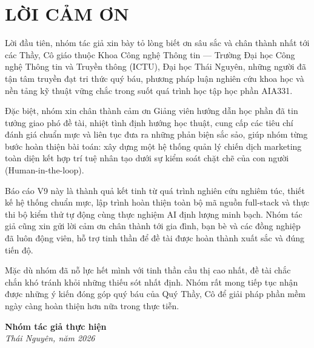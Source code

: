 \chapter*{LỜI CẢM ƠN}

Lời đầu tiên, nhóm tác giả xin bày tỏ lòng biết ơn sâu sắc và chân thành nhất tới các Thầy, Cô giáo thuộc Khoa Công nghệ Thông tin --- Trường Đại học Công nghệ Thông tin và Truyền thông (ICTU), Đại học Thái Nguyên, những người đã tận tâm truyền đạt tri thức quý báu, phương pháp luận nghiên cứu khoa học và nền tảng kỹ thuật vững chắc trong suốt quá trình học tập học phần AIA331.

Đặc biệt, nhóm xin chân thành cảm ơn Giảng viên hướng dẫn học phần đã tin tưởng giao phó đề tài, nhiệt tình định hướng học thuật, cung cấp các tiêu chí đánh giá chuẩn mực và liên tục đưa ra những phản biện sắc sảo, giúp nhóm từng bước hoàn thiện bài toán: xây dựng một hệ thống quản lý chiến dịch marketing toàn diện kết hợp trí tuệ nhân tạo dưới sự kiểm soát chặt chẽ của con người (Human-in-the-loop).

Báo cáo V9 này là thành quả kết tinh từ quá trình nghiên cứu nghiêm túc, thiết kế hệ thống chuẩn mực, lập trình hoàn thiện toàn bộ mã nguồn full-stack và thực thi bộ kiểm thử tự động cùng thực nghiệm AI định lượng minh bạch. Nhóm tác giả cũng xin gửi lời cảm ơn chân thành tới gia đình, bạn bè và các đồng nghiệp đã luôn động viên, hỗ trợ tinh thần để đề tài được hoàn thành xuất sắc và đúng tiến độ.

Mặc dù nhóm đã nỗ lực hết mình với tinh thần cầu thị cao nhất, đề tài chắc chắn khó tránh khỏi những thiếu sót nhất định. Nhóm rất mong tiếp tục nhận được những ý kiến đóng góp quý báu của Quý Thầy, Cô để giải pháp phần mềm ngày càng hoàn thiện hơn nữa trong thực tiễn.

\vspace{1.5cm}
\begin{flushright}
  \textbf{Nhóm tác giả thực hiện}\\
  \textit{Thái Nguyên, năm 2026}
\end{flushright}
